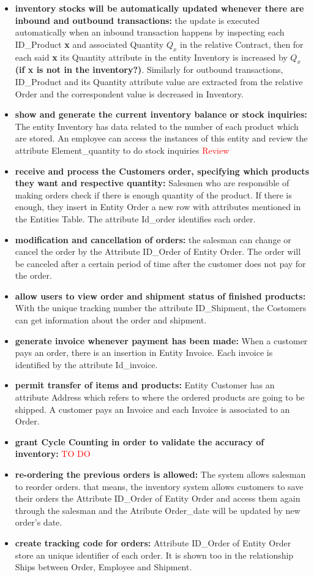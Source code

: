 \begin{itemize}
\item \textbf{inventory stocks will be automatically updated whenever there are inbound and outbound transactions:} the update is executed automatically when an inbound transaction happens by inspecting each ID\_Product \textbf{x} and associated Quantity \(Q_x\) in the relative Contract, then for each said \textbf{x} its Quantity attribute in the entity Inventory is increased by  \(Q_x\) \textbf{(if x is not in the inventory?)}. Similarly for outbound transactions, ID\_Product and its Quantity attribute value are extracted from the relative Order and the correspondent value is decreased in Inventory.
    \item \textbf{show and generate the current inventory balance or stock inquiries:} The entity Inventory has data related to the number of each product which are stored. An employee can access the instances of this entity and review the attribute Element\_quantity to do stock inquiries \textcolor{Red}{Review} 
    \item \textbf{receive and process the Customers order, specifying which products they want and respective quantity:} Salesmen who are responsible of making orders check if there is enough quantity of the product. If there is enough, they insert in Entity Order a new row with attributes mentioned in the Entities Table. The attribute Id\_order identifies each order.
    \item \textbf{modification and cancellation of orders:} the salesman can change or cancel the order by the Attribute ID\_Order of Entity Order. The order will be canceled after a certain period of time after the customer does not pay for the order.
    \item \textbf{allow users to view order and shipment status of finished products:} With the unique tracking number the attribute ID\_Shipment, the Costomers can get information about the order and shipment.
    \item \textbf{generate invoice whenever payment has been made:} When a customer pays an order, there is an insertion in  Entity Invoice. Each invoice is identified by the attribute Id\_invoice.
    \item \textbf{permit transfer of items and products:} Entity Customer has an attribute Address which refers to where the ordered products are going to be shipped. A customer pays an Invoice and each Invoice is associated to an Order.
    \item \textbf{grant Cycle Counting in order to validate the accuracy of inventory:} \textcolor{Red}{TO DO}
    \item \textbf{re-ordering the previous orders is allowed:} The system allows salesman to reorder orders. that means, the inventory system allows customers to save their orders the Attribute ID\_Order of Entity Order and access them again through the salesman and the Atribute Order\_date will be updated by new order's date.
    \item \textbf{create tracking code for orders:} Attribute ID\_Order of Entity Order store an unique identifier of each order. It is shown too in the relationship Ships between Order, Employee and Shipment.
\end{itemize}




